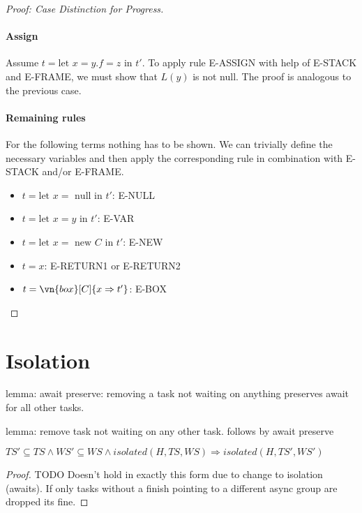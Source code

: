 \begin{proof}[Proof: Case Distinction for Progress]
\paragraph{Assign}
Assume $t = \text{let } x = y.f = z \text{ in } t'$. To apply rule E-ASSIGN with help of E-STACK and E-FRAME, we must show that $L(y)$ is not null. The proof is analogous to the previous case.

\paragraph{Remaining rules}
For the following terms nothing has to be shown. We can trivially define the necessary variables and then apply the corresponding rule in combination with E-STACK and/or E-FRAME.
\begin{itemize}
    \item $t = \text{let } x = \text{ null in } t'$: E-NULL
    \item $t = \text{let } x = y \text{ in } t'$: E-VAR
    \item $t = \text{let } x = \text{ new } C \text{ in } t'$: E-NEW
    \item $t = x$: E-RETURN1 or E-RETURN2
    \item $t = \vn{box}[C]\{ x \Rightarrow t' \}$: E-BOX
\end{itemize}
\end{proof} %


\section{Isolation}

lemma: await preserve: removing a task not waiting on anything preserves await for all other tasks.

lemma: remove task not waiting on any other task. follows by await preserve

\begin{lemma} \label{iso-subset}
    $TS' \subseteq TS \wedge WS' \subseteq WS \wedge isolated(H,TS,WS) \Rightarrow isolated(H, TS', WS')$
\end{lemma}
\begin{proof}
TODO Doesn't hold in exactly this form due to change to isolation (awaits). If only tasks without a finish pointing to a different async group are dropped its fine.
\end{proof}

